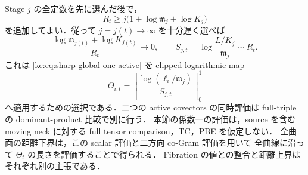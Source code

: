 \begin{remark}[遅い対角選択と適用範囲]
\label{ke:sharp-normal-diagonal-remark}
Stage $j$ の全定数を先に選んだ後で，
\[
 R_t\ge j\bigl(1+\log\mathfrak m_j+\log K_j\bigr)
\]
を追加してよい．従って $j=j(t)\to\infty$ を十分遅く選べば
\[
 \frac{\log\mathfrak m_{j(t)}+\log K_{j(t)}}{R_t}\longrightarrow0,
 \qquad
 S_{j,t}=\log\frac{L/K_j}{\mathfrak m_j}\sim R_t.
\]
これは \eqref{ke:eq:sharp-global-one-active} を clipped logarithmic map
\[
 \Theta_{i,t}
 =\left[\frac{\log(\ell_i/\mathfrak m_j)}{S_{j,t}}\right]_0^1
\]
へ適用するための選択である．二つの active covectors の同時評価は
full-triple の dominant-product 比較で別に行う．
本節の係数一の評価は，source を含む moving neck に対する
full tensor comparison，TC，PBE を仮定しない．
全曲面の距離下界は，この scalar 評価と二方向 co-Gram 評価を用いて
全曲線に沿って $\Theta_t$ の長さを評価することで得られる．
Fibration の値との整合と距離上界はそれぞれ別の主張である．
\end{remark}

